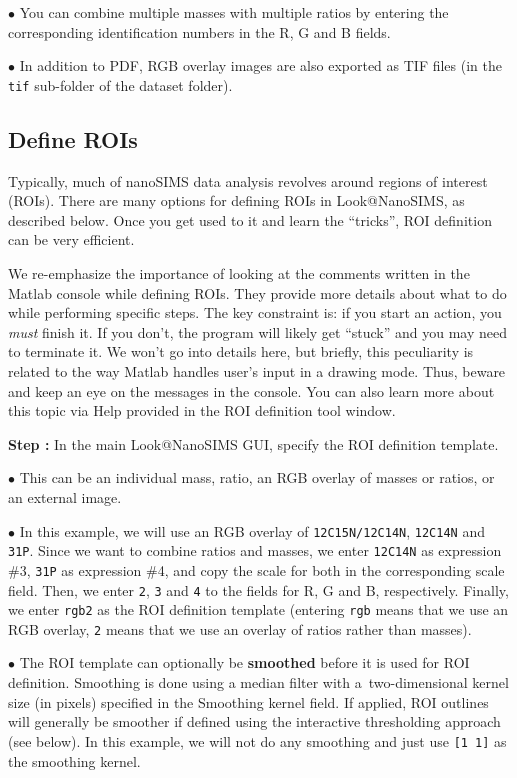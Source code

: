 \documentclass[a4paper, 11pt]{article}
\newcommand{\ttt}[1]{\texttt{#1}}
\newcommand{\lans}[1]{{\color{magenta}#1}}
\newcommand{\lanstf}[1]{{\color{cyan}#1}}
\newcounter{step}
\newcommand\s{\addtocounter{step}{1}\noindent\textbf{Step \thestep:}{ }}
\newcommand\bul{\noindent$\bullet${ }}
\newcommand\bb[1]{\textbf{#1}}
\begin{document}
\bul You can combine multiple masses with multiple ratios by entering the corresponding identification numbers in the R, G and B fields.

\bul In addition to PDF, RGB overlay images are also exported as TIF files (in the \ttt{tif} sub-folder of the dataset folder).


\subsection{Define ROIs}
\setcounter{step}{0}

Typically, much of nanoSIMS data analysis revolves around regions of interest (ROIs). There are many options for defining ROIs in Look@NanoSIMS, as described below. Once you get used to it and learn the ``tricks'', ROI definition can be very efficient. 

We re-emphasize the importance of looking at the comments written in the Matlab console while defining ROIs. They provide more details about what to do while performing specific steps. The key constraint is: if you start an action, you \emph{must} finish it. If you don't, the program will likely get ``stuck'' and you may need to terminate it. We won't go into details here, but briefly, this peculiarity is related to the way Matlab handles user's input in a drawing mode. Thus, beware and keep an eye on the messages in the console. You can also learn more about this topic via \lans{Help} provided in the ROI definition tool window.

\s In the main Look@NanoSIMS GUI, specify the \lanstf{ROI definition template}. 

\bul This can be an individual mass, ratio, an RGB overlay of masses or ratios, or an external image.

\bul In this example, we will use an RGB overlay of \ttt{12C15N/12C14N}, \ttt{12C14N} and \ttt{31P}. Since we want to combine ratios and masses, we enter \ttt{12C14N} as expression \#3, \ttt{31P} as expression \#4, and copy the scale for both in the corresponding \lanstf{scale} field. Then, we enter \ttt{2}, \ttt{3} and \ttt{4} to the fields for \lanstf{R}, \lanstf{G} and \lanstf{B}, respectively. Finally, we enter \ttt{rgb2} as the \lanstf{ROI definition template} (entering \ttt{rgb} means that we use an RGB overlay, \ttt{2} means that we use an overlay of ratios rather than masses).

\bul The ROI template can optionally be \bb{smoothed} before it is used for ROI definition. Smoothing is done using a median filter with a~two-dimensional kernel size (in pixels) specified in the \lanstf{Smoothing kernel} field. If applied, ROI outlines will generally be smoother if defined using the \lans{interactive thresholding} approach (see below). In this example, we will not do any smoothing and just use \ttt{[1 1]} as the smoothing kernel.
\end{document}
